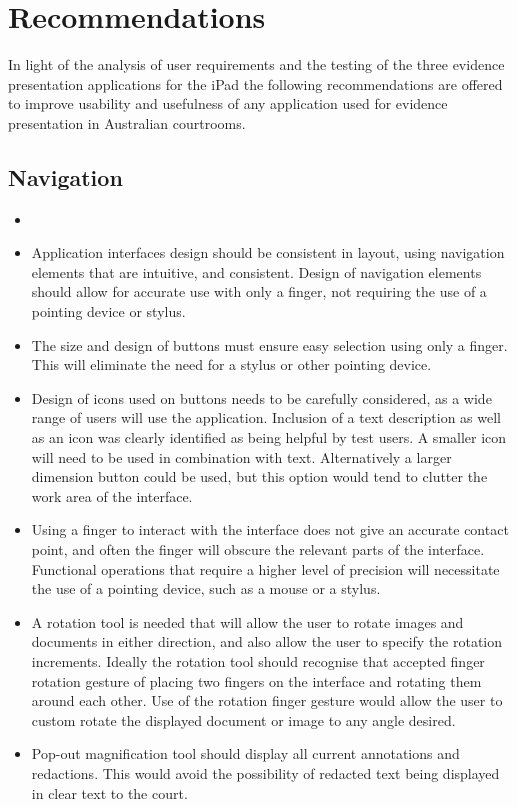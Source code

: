 \section{Recommendations}
\doublespace
In light of the analysis of user requirements and the testing of the three evidence presentation applications for the iPad the following recommendations are offered to improve usability and usefulness of any application used for evidence presentation in Australian courtrooms.\\
\subsection{Navigation}
\begin{itemize}
    \item 

    \item Application interfaces design should be consistent in layout, using navigation elements that are intuitive, and consistent. Design of navigation elements should allow for accurate use with only a finger, not requiring the use of a pointing device or stylus.
    \item The size and design of buttons must ensure easy selection using only a finger. This will eliminate the need for a stylus or other pointing device.
    \item Design of icons used on buttons needs to be carefully considered, as a wide range of users will use the application. Inclusion of a text description as well as an icon was clearly identified as being helpful by test users. A smaller icon will need to be used in combination with text. Alternatively a larger dimension button could be used, but this option would tend to clutter the work area of the interface.
    \item Using a finger to interact with the interface does not give an accurate contact point, and often the finger will obscure the relevant parts of the interface. Functional operations that require a higher level of precision will necessitate the use of a pointing device, such as a mouse or a stylus.
    \item A rotation tool is needed that will allow the user to rotate images and documents in either direction, and also allow the user to specify the rotation increments. Ideally the rotation tool should recognise that accepted finger rotation gesture of placing two fingers on the interface and rotating them around each other. Use of the rotation finger gesture would allow the user to custom rotate the displayed document or image to any angle desired.
    \item Pop-out magnification tool should display all current annotations and redactions. This would avoid the possibility of redacted text being displayed in clear text to the court.
\end{itemize}
